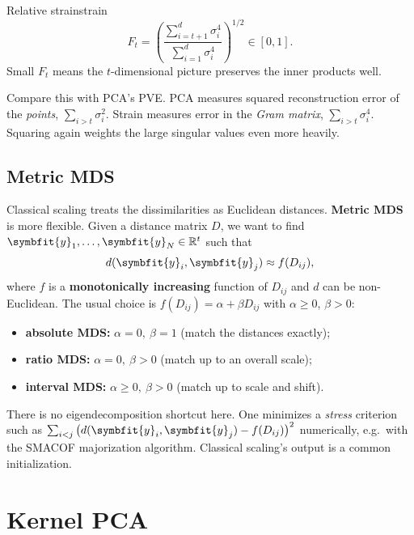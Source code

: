 \documentclass[11pt]{article}
\newcommand{\bm}[1]{\symbfit{#1}}
\newcommand{\R}{\mathbb{R}}
\newcommand{\vy}{\bm{y}}
\begin{document}
\begin{definition}{Relative strain}{strain}
\[
F_t=\left(\frac{\sum_{i=t+1}^d\sigma_i^4}{\sum_{i=1}^d\sigma_i^4}\right)^{1/2}\in[0,1].
\]
Small $F_t$ means the $t$-dimensional picture preserves the inner products well.
\end{definition}

\begin{deeper}
Compare this with PCA's PVE. PCA measures squared reconstruction error of the
\emph{points}, $\sum_{i>t}\sigma_i^2$. Strain measures error in the \emph{Gram matrix},
$\sum_{i>t}\sigma_i^4$. Squaring again weights the large singular values even more heavily.
\end{deeper}

\subsection{Metric MDS}

Classical scaling treats the dissimilarities as Euclidean distances. \textbf{Metric MDS}
is more flexible. Given a distance matrix $D$, we want to find $\vy_1,\dots,\vy_N\in\R^t$ such that
\[
d(\vy_i,\vy_j)\approx f(D_{ij}),
\]
where $f$ is a \textbf{monotonically increasing} function of $D_{ij}$ and $d$ can be non-Euclidean.
The usual choice is $f(D_{ij})=\alpha+\beta D_{ij}$ with $\alpha\ge0$, $\beta>0$:
\begin{itemize}[nosep]
\item \textbf{absolute MDS:} $\alpha=0,\ \beta=1$ (match the distances exactly);
\item \textbf{ratio MDS:} $\alpha=0,\ \beta>0$ (match up to an overall scale);
\item \textbf{interval MDS:} $\alpha\ge0,\ \beta>0$ (match up to scale and shift).
\end{itemize}

\begin{deeper}
There is no eigendecomposition shortcut here. One minimizes a \emph{stress} criterion such
as $\sum_{i<j}\big(d(\vy_i,\vy_j)-f(D_{ij})\big)^2$ numerically, e.g.\ with the SMACOF
majorization algorithm. Classical scaling's output is a common initialization.
\end{deeper}

\section{Kernel PCA}\label{sec:kpca}
\end{document}
